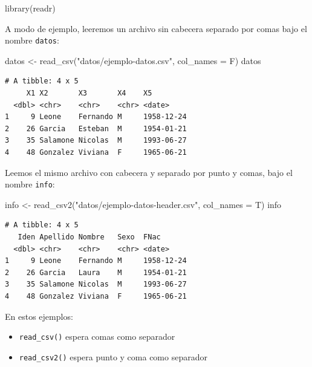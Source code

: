 \documentclass[
  spanish,
  letterpaper,
  DIV=11,
  numbers=noendperiod]{scrreprt}
\newenvironment{Shaded}{\begin{snugshade}}{\end{snugshade}}
\newcommand{\AttributeTok}[1]{\textcolor[rgb]{0.40,0.45,0.13}{#1}}
\newcommand{\FunctionTok}[1]{\textcolor[rgb]{0.28,0.35,0.67}{#1}}
\newcommand{\NormalTok}[1]{\textcolor[rgb]{0.00,0.23,0.31}{#1}}
\newcommand{\OtherTok}[1]{\textcolor[rgb]{0.00,0.23,0.31}{#1}}
\newcommand{\StringTok}[1]{\textcolor[rgb]{0.13,0.47,0.30}{#1}}
\begin{document}
\begin{Shaded}
\begin{Highlighting}[]
\FunctionTok{library}\NormalTok{(readr)}
\end{Highlighting}
\end{Shaded}

A modo de ejemplo, leeremos un archivo sin cabecera separado por comas
bajo el nombre \texttt{datos}:

\begin{Shaded}
\begin{Highlighting}[]
\NormalTok{datos }\OtherTok{\textless{}{-}} \FunctionTok{read\_csv}\NormalTok{(}\StringTok{"datos/ejemplo{-}datos.csv"}\NormalTok{, }\AttributeTok{col\_names =}\NormalTok{ F)}
\NormalTok{datos}
\end{Highlighting}
\end{Shaded}

\begin{verbatim}
# A tibble: 4 x 5
     X1 X2       X3       X4    X5        
  <dbl> <chr>    <chr>    <chr> <date>    
1     9 Leone    Fernando M     1958-12-24
2    26 Garcia   Esteban  M     1954-01-21
3    35 Salamone Nicolas  M     1993-06-27
4    48 Gonzalez Viviana  F     1965-06-21
\end{verbatim}

Leemos el mismo archivo con cabecera y separado por punto y comas, bajo
el nombre \texttt{info}:

\begin{Shaded}
\begin{Highlighting}[]
\NormalTok{info }\OtherTok{\textless{}{-}} \FunctionTok{read\_csv2}\NormalTok{(}\StringTok{"datos/ejemplo{-}datos{-}header.csv"}\NormalTok{, }\AttributeTok{col\_names =}\NormalTok{ T)}
\NormalTok{info}
\end{Highlighting}
\end{Shaded}

\begin{verbatim}
# A tibble: 4 x 5
   Iden Apellido Nombre   Sexo  FNac      
  <dbl> <chr>    <chr>    <chr> <date>    
1     9 Leone    Fernando M     1958-12-24
2    26 Garcia   Laura    M     1954-01-21
3    35 Salamone Nicolas  M     1993-06-27
4    48 Gonzalez Viviana  F     1965-06-21
\end{verbatim}

En estos ejemplos:

\begin{itemize}
\item
  \texttt{read\_csv()} espera comas como separador
\item
  \texttt{read\_csv2()} espera punto y coma como separador
\end{itemize}
\end{document}
